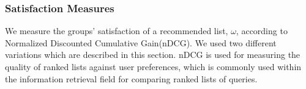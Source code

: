 \subsubsection{Satisfaction Measures}\label{sec:satisfactionmeasures}
We measure the groups' satisfaction of a recommended list, $\omega$, according to Normalized Discounted Cumulative Gain(nDCG). We used two different variations which are described in this section. nDCG is used for measuring the quality of ranked lists against user preferences, which is commonly used within the information retrieval field for comparing ranked lists of queries\cite{ndcg}.


